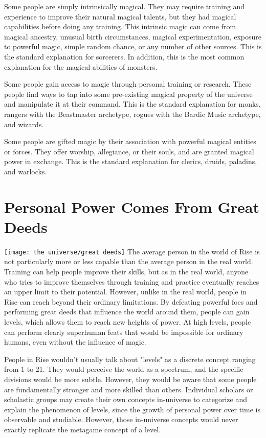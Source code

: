     Some people are simply intrinsically magical.
    They may require training and experience to improve their natural magical talents, but they had magical capabilities before doing any training.
    This intrinsic magic can come from magical ancestry, unusual birth circumstances, magical experimentation, exposure to powerful magic, simple random chance, or any number of other sources.
    This is the standard explanation for sorcerers.
    In addition, this is the most common explanation for the magical abilities of monsters.

    Some people gain access to magic through personal training or research.
    These people find ways to tap into some pre-existing magical property of the universe and manipulate it at their command.
    This is the standard explanation for monks, rangers with the Beastmaster archetype, rogues with the Bardic Music archetype, and wizards.

    Some people are gifted magic by their association with powerful magical entities or forces.
    They offer worship, allegiance, or their souls, and are granted magical power in exchange.
    This is the standard explanation for clerics, druids, paladins, and warlocks.

\section{Personal Power Comes From Great Deeds}
    \texttt{[image: the universe/great deeds]}
    The average person in the world of Rise is not particularly more or less capable than the average person in the real world.
    Training can help people improve their skills, but as in the real world, anyone who tries to improve themselves through training and practice eventually reaches an upper limit to their potential.
    However, unlike in the real world, people in Rise can reach beyond their ordinary limitations.
    By defeating powerful foes and performing great deeds that influence the world around them, people can gain levels, which allows them to reach new heights of power.
    At high levels, people can perform clearly superhuman feats that would be impossible for ordinary humans, even without the influence of magic.

    People in Rise wouldn't usually talk about "levels" as a discrete concept ranging from 1 to 21.
    They would perceive the world as a spectrum, and the specific divisions would be more subtle.
    However, they would be aware that some people are fundamentally stronger and more skilled than others.
    Individual scholars or scholastic groups may create their own concepts in-universe to categorize and explain the phenomenon of levels, since the growth of personal power over time is observable and studiable. 
    However, those in-universe concepts would never exactly replicate the metagame concept of a level.

